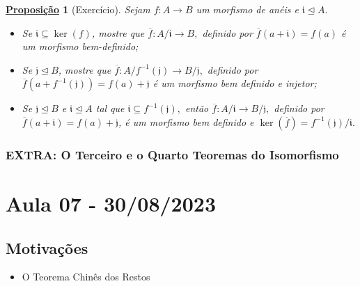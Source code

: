 \documentclass{article}
\newtheorem*{prop*}{\underline{Proposi\c c\~ao}}
\begin{document}
\begin{prop*}[Exercício]
  Sejam \(f:A\rightarrow B\) um morfismo de anéis e \(\mathfrak{i}\trianglelefteq{A}.\)
  \begin{itemize}
    \item[1)] Se \(\mathfrak{i}\subseteq \ker{(f)}\), mostre que \(\overline{f}:A/\mathfrak{i}\rightarrow B,\) definido por \(\overline{f}(a+\mathfrak{i}) = f(a)\) é 
      um morfismo bem-definido;
    \item[2)] Se \(\mathfrak{j}\trianglelefteq{B}\), mostre que \(\overline{f}:A/f^{-1}(\mathfrak{j})\rightarrow B/\mathfrak{j},\) definido por
      \(\overline{f}(a+f^{-1}(\mathfrak{j})) = f(a) + \mathfrak{j}\) é um morfismo bem definido e injetor;
    \item[3)] Se \(\mathfrak{j}\trianglelefteq{B}\) e \(\mathfrak{i}\trianglelefteq{A}\) tal que \(\mathfrak{i}\subseteq f^{-1}(\mathfrak{j}),\) então
      \(\overline{f}:A/\mathfrak{i}\rightarrow B/\mathfrak{j}, \) definido por \(\overline{f}(a+\mathfrak{i})=f(a)+\mathfrak{j}\),
      é um morfismo bem definido e \(\ker{(\overline{f})} = f^{-1}(\mathfrak{j})/\mathfrak{i}.\)
  \end{itemize}
\end{prop*}
\subsubsection{EXTRA: O Terceiro e o Quarto Teoremas do Isomorfismo}
\newpage

\section{Aula 07 - 30/08/2023}
\subsection{Motivações}
\begin{itemize}
  \item O Teorema Chinês dos Restos
\end{itemize}
\end{document}

